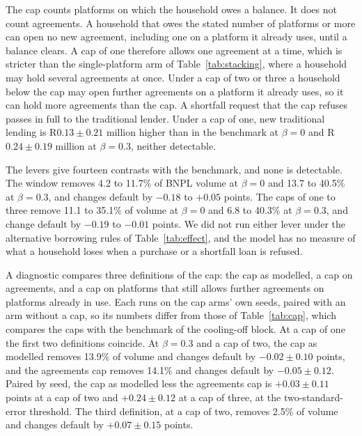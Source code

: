 The cap counts platforms on which the household owes a balance. It does not count agreements.
A household that owes the stated number of platforms or more can open no new agreement,
including one on a platform it already uses, until a balance clears. A cap of one therefore
allows one agreement at a time, which is stricter than the single-platform arm of
Table~\ref{tab:stacking}, where a household may hold several agreements at once. Under a cap of
two or three a household below the cap may open further agreements on a platform it already
uses, so it can hold more agreements than the cap. A shortfall request that the cap refuses
passes in full to the traditional lender. Under a cap of one, new traditional lending is
R$0.13 \pm 0.21$ million higher than in the benchmark at $\beta = 0$ and R$0.24 \pm 0.19$
million at $\beta = 0.3$, neither detectable.

The levers give fourteen contrasts with the benchmark, and none is detectable. The window
removes 4.2 to 11.7\% of \ac{BNPL} volume at $\beta = 0$ and 13.7 to 40.5\% at $\beta = 0.3$, and
changes default by $-0.18$ to $+0.05$ points. The caps of one to three remove 11.1 to 35.1\% of
volume at $\beta = 0$ and 6.8 to 40.3\% at $\beta = 0.3$, and change default by $-0.19$ to $-0.01$
points. We did not run either lever under the alternative borrowing rules of
Table~\ref{tab:effect}, and the model has no measure of what a household loses when a purchase
or a shortfall loan is refused.

A diagnostic compares three definitions of the cap: the cap as modelled, a cap on agreements, and
a cap on platforms that still allows further agreements on platforms already in use. Each runs on
the cap arms' own seeds, paired with an arm without a cap, so its numbers differ from those of
Table~\ref{tab:cap}, which compares the caps with the benchmark of the cooling-off block. At a cap
of one the first two definitions coincide. At $\beta = 0.3$ and a cap of two, the cap as modelled
removes 13.9\% of volume and changes default by $-0.02 \pm 0.10$ points, and the agreements cap
removes 14.1\% and changes default by $-0.05 \pm 0.12$. Paired by seed, the cap as modelled less
the agreements cap is $+0.03 \pm 0.11$ points at a cap of two and $+0.24 \pm 0.12$ at a cap of
three, at the two-standard-error threshold. The third definition, at a cap of two, removes 2.5\%
of volume and changes default by $+0.07 \pm 0.15$ points.

